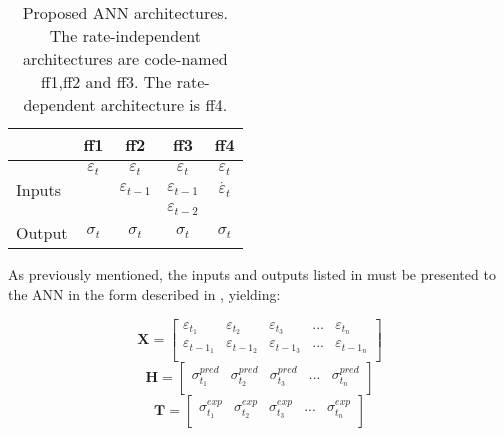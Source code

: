\begin{table}[htbp!]
    \centering
    \caption{Proposed ANN architectures. The rate-independent architectures are code-named ff1,ff2 and ff3. The rate-dependent architecture is ff4.}
    \begin{tabular}{lcccc}
    \toprule
                            & ff1               & ff2                   & ff3                   & ff4\\
    \hline
    \multirow{3}{*}{Inputs} & $\varepsilon_t$   & $\varepsilon_t$       & $\varepsilon_t$       & $\varepsilon_t$       \\
                            &                   & $\varepsilon_{t-1}$   & $\varepsilon_{t-1}$   & $\Dot{\varepsilon_t}$ \\
                            &                   &                       & $\varepsilon_{t-2}$   &                       \\
    \hline
    Output                  & $\sigma_t$        & $\sigma_t$            & $\sigma_t$            & $\sigma_t$            \\
    \bottomrule
    \end{tabular}
    \label{tbl:ANNArchitectures}
\end{table}

As previously mentioned, the inputs and outputs listed in  must be presented to the ANN in the form described in , yielding:

\begin{equation}
    \mathbf{X} = 
        \begin{bmatrix}
            \varepsilon_{t_1}  & \varepsilon_{t_2}       & \varepsilon_{t_3}      & ... & \varepsilon_{t_n} \\ 
            \varepsilon_{{t-1}_1}& \varepsilon_{{t-1}_2}  & \varepsilon_{{t-1}_3}  & ... & \varepsilon_{{t-1}_n} \\
        \end{bmatrix}
\end{equation}
\begin{equation}
    \mathbf{H} = 
        \begin{bmatrix}
            \sigma^{pred}_{t_1}  & \sigma^{pred}_{t_2}       & \sigma^{pred}_{t_3}      & ... & \sigma^{pred}_{t_n} \\ 
        \end{bmatrix}
\end{equation}
\begin{equation}
    \mathbf{T} = 
        \begin{bmatrix}
            \sigma^{exp}_{t_1}  & \sigma^{exp}_{t_2}       & \sigma^{exp}_{t_3}      & ... & \sigma^{exp}_{t_n} \\ 
        \end{bmatrix}
\end{equation}


